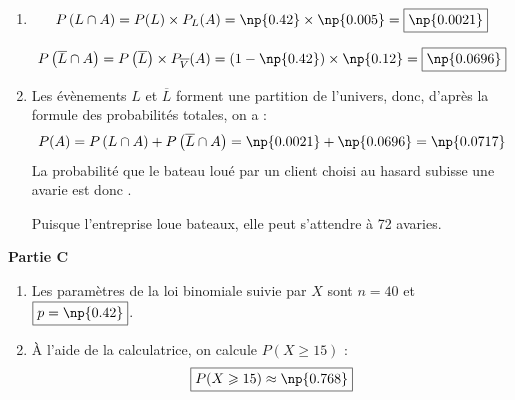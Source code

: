 \begin{enumerate}
	\item \[P\left(L \cap A\right) = P(L) \times P_{L}(A) = \np{0.42} \times \np{0.005} = \boxed{\np{0.0021}}\]
	\smallskip
	
	\[P\left(\overline{L} \cap A\right) = P\left(\overline{L}\right) \times P_{\overline{V}}(A) = (1-\np{0.42}) \times \np{0.12} = \boxed{\np{0.0696}}\]
	\item Les évènements $L$ et $\overline{L}$ forment une partition de l'univers, donc, d'après la formule des probabilités totales, on a :
	\[P(A) = P\left(L \cap A\right) + P\left(\overline{L} \cap A\right) = \np{0.0021} + \np{0.0696} = \np{0.0717}\]
La probabilité que le bateau loué par un client choisi au hasard subisse une avarie est donc .
	
Puisque l'entreprise loue  bateaux, elle peut s'attendre à 72 avaries.
\end{enumerate}

\medskip

\textbf{Partie C}

\medskip

\begin{enumerate}
	\item Les paramètres de la loi binomiale suivie par $X$ sont $\boxed{n=40}$ et $\boxed{p=\np{0.42}}$.
	\item À l'aide de la calculatrice, on calcule $P(X \geqslant 15)$ :
	\[\boxed{P(X \geqslant 15) \approx \np{0.768}}\]
\end{enumerate}

\bigskip
